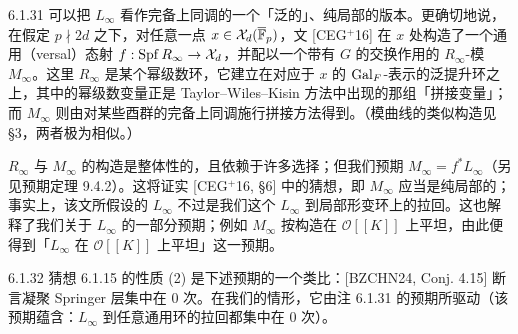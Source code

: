 \begin{rem}{6.1.31}
可以把 $L_\infty$ 看作完备上同调的一个「泛的」、纯局部的版本。更确切地说，在假定 $p\nmid 2d$ 之下，对任意一点 $x\in\mathcal X_d(\overline{\mathbb{F}}_p)$，文 [CEG$^+$16] 在 $x$ 处构造了一个通用（versal）态射 $f:\operatorname{Spf} R_\infty\to\mathcal X_d$，并配以一个带有 $G$ 的交换作用的 $R_\infty$-模 $M_\infty$。这里 $R_\infty$ 是某个幂级数环，它建立在对应于 $x$ 的 $\operatorname{Gal}_F$-表示的泛提升环之上，其中的幂级数变量正是 Taylor--Wiles--Kisin 方法中出现的那组「拼接变量」；而 $M_\infty$ 则由对某些酉群的完备上同调施行拼接方法得到。（模曲线的类似构造见 §3，两者极为相似。）

$R_\infty$ 与 $M_\infty$ 的构造是整体性的，且依赖于许多选择；但我们预期 $M_\infty=f^*L_\infty$（另见预期定理 9.4.2）。这将证实 [CEG$^+$16, §6] 中的猜想，即 $M_\infty$ 应当是纯局部的；事实上，该文所假设的 $L_\infty$ 不过是我们这个 $L_\infty$ 到局部形变环上的拉回。这也解释了我们关于 $L_\infty$ 的一部分预期；例如 $M_\infty$ 按构造在 $\mathcal O[[K]]$ 上平坦，由此便得到「$L_\infty$ 在 $\mathcal O[[K]]$ 上平坦」这一预期。
\end{rem}

\begin{rem}{6.1.32}
猜想 6.1.15 的性质 (2) 是下述预期的一个类比：[BZCHN24, Conj. 4.15] 断言凝聚 Springer 层集中在 0 次。在我们的情形，它由注 6.1.31 的预期所驱动（该预期蕴含：$L_\infty$ 到任意通用环的拉回都集中在 0 次）。
\end{rem}

